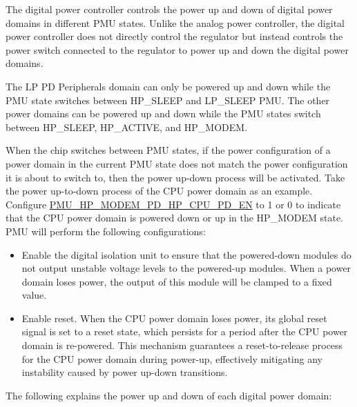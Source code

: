 \documentclass[main\_\_EN.tex]{subfiles}
\begin{document}
The digital power controller controls the power up and down of digital power domains in different PMU states. Unlike the analog power controller, the digital power controller does not directly control the regulator but instead controls the power switch connected to the regulator to power up and down the digital power domains.

The LP PD Peripherals domain can only be powered up and down while the PMU state switches between HP\_SLEEP and LP\_SLEEP PMU. The other power domains can be powered up and down while the PMU states switch between HP\_SLEEP, HP\_ACTIVE, and HP\_MODEM.

When the chip switches between PMU states, if the power configuration of a power domain in the current PMU state does not match the power configuration it is about to switch to, then the power up-down process will be activated. Take the power up-to-down process of the CPU power domain as an example. Configure \hyperref[fielddesc:PMUHPMODEMPDHPCPUPDEN]{PMU\_HP\_MODEM\_PD\_HP\_CPU\_PD\_EN} to 1 or 0 to indicate that the CPU power domain is powered down or up in the HP\_MODEM state. PMU will perform the following configurations:

\begin{itemize}

\item Enable the digital isolation unit to ensure that the powered-down modules do not output unstable voltage levels to the powered-up modules. When a power domain loses power, the output of this module will be clamped to a fixed value.

\item Enable reset. When the CPU power domain loses power, its global reset signal is set to a reset state, which persists for a period after the CPU power domain is re-powered. This mechanism guarantees a reset-to-release process for the CPU power domain during power-up, effectively mitigating any instability caused by power up-down transitions.
\end{itemize}

The following explains the power up and down of each digital power domain:
\end{document}
